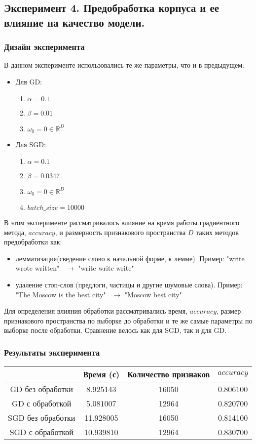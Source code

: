 \subsection{Эксперимент 4. Предобработка корпуса и ее влияние на качество модели.}
\subsubsection{Дизайн эксперимента}
В данном эксперименте использовались те же параметры, что и в предыдущем:
\begin{itemize}
	\item Для GD:
	\begin{enumerate}
		\item $\alpha = 0.1$
		\item  $\beta = 0.01$
		\item  $\omega_0 = 0 \in \mathbb{R}^D$
	\end{enumerate}
	\item Для SGD:
	\begin{enumerate}
		\item $\alpha = 0.1$
		\item  $\beta = 0.0347$
		\item  $\omega_0 = 0 \in \mathbb{R}^D$
		\item  $batch\_size = 10000 $
	\end{enumerate}
\end{itemize}
В этом эксперименте рассматривалось влияние на  время работы градиентного метода, $accuracy$, и размерность признакового пространства $D$ таких методов предобработки как:
\begin{itemize}
	\item лемматизация(сведение слово к начальной форме, к лемме). Пример:
	"write wrote written" \ $\rightarrow$ "write write write"
	\item удаление стоп-слов (предлоги, частицы и другие шумовые слова). Пример:
	"The Moscow is the best city" \ $\rightarrow$ "Moscow best city"
\end{itemize}
Для определения влияния обработки рассматривались время, $accuracy$, размер признакового пространства по выборке до обработки и те же самые параметры по выборке после обработки. Сравнение велось как для SGD, так и для GD.
\subsubsection{Результаты эксперимента}
\begin{tabular}{|c|c|c|c|}
	\hline
		& Время (с)  & Количество признаков & $accuracy$ \\
	\hline
		GD без обработки & 8.925143 &  16050 & 0.806100 \\
	\hline
		GD с обработкой & 5.081007 & 12964 & 0.820700 \\
	\hline
		SGD без обработки & 11.928005 &  16050 & 0.814100 \\
	\hline
		SGD с обработкой & 10.939810 & 12964 & 0.830700 \\
	\hline
\end{tabular}\\

